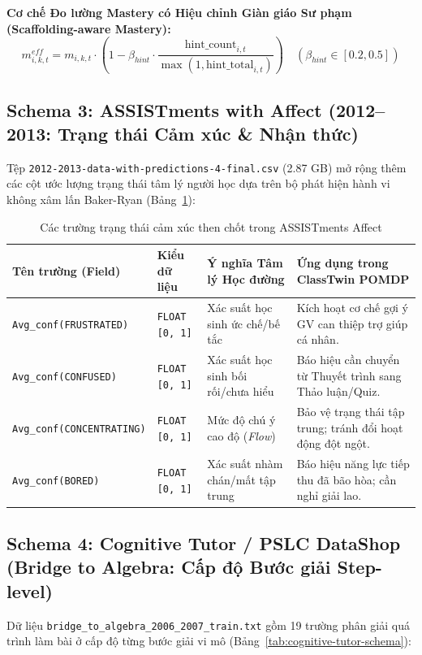 \noindent\textbf{Cơ chế Đo lường Mastery có Hiệu chỉnh Giàn giáo Sư phạm (Scaffolding-aware Mastery):}
\begin{equation}\label{eq:scaffold-mastery-full}
  m_{i, k, t}^{eff} = m_{i, k, t} \cdot \left( 1 - \beta_{hint} \cdot \frac{\text{hint\_count}_{i, t}}{\max(1, \text{hint\_total}_{i, t})} \right) \quad (\beta_{hint} \in [0.2, 0.5])
\end{equation}

\subsection{Schema 3: ASSISTments with Affect (2012--2013: Trạng thái Cảm xúc \& Nhận thức)}\label{subsec:schema-affect}
Tệp \texttt{2012-2013-data-with-predictions-4-final.csv} (2.87 GB) mở rộng thêm các cột ước lượng trạng thái tâm lý người học dựa trên bộ phát hiện hành vi không xâm lấn Baker-Ryan (Bảng~\ref{tab:affect-schema}):

\begin{table}[htbp]
  \centering\small
  \caption{Các trường trạng thái cảm xúc then chốt trong ASSISTments Affect}\label{tab:affect-schema}
  \begin{tabularx}{\textwidth}{p{4.2cm} p{2.2cm} p{3.8cm} X}
    \toprule
    \textbf{Tên trường (Field)} & \textbf{Kiểu dữ liệu} & \textbf{Ý nghĩa Tâm lý Học đường} & \textbf{Ứng dụng trong ClassTwin POMDP} \\
    \midrule
    \texttt{Avg\_conf(FRUSTRATED)} & \texttt{FLOAT [0, 1]} & Xác suất học sinh ức chế/bế tắc & Kích hoạt cơ chế gợi ý GV can thiệp trợ giúp cá nhân. \\
    \addlinespace
    \texttt{Avg\_conf(CONFUSED)} & \texttt{FLOAT [0, 1]} & Xác suất học sinh bối rối/chưa hiểu & Báo hiệu cần chuyển từ Thuyết trình sang Thảo luận/Quiz. \\
    \addlinespace
    \texttt{Avg\_conf(CONCENTRATING)} & \texttt{FLOAT [0, 1]} & Mức độ chú ý cao độ (\textit{Flow}) & Bảo vệ trạng thái tập trung; tránh đổi hoạt động đột ngột. \\
    \addlinespace
    \texttt{Avg\_conf(BORED)} & \texttt{FLOAT [0, 1]} & Xác suất nhàm chán/mất tập trung & Báo hiệu năng lực tiếp thu đã bão hòa; cần nghỉ giải lao. \\
    \bottomrule
  \end{tabularx}
\end{table}

\subsection{Schema 4: Cognitive Tutor / PSLC DataShop (Bridge to Algebra: Cấp độ Bước giải Step-level)}\label{subsec:schema-bridge-algebra}
Dữ liệu \texttt{bridge\_to\_algebra\_2006\_2007\_train.txt} gồm 19 trường phân giải quá trình làm bài ở cấp độ từng bước giải vi mô (Bảng~\ref{tab:cognitive-tutor-schema}):

